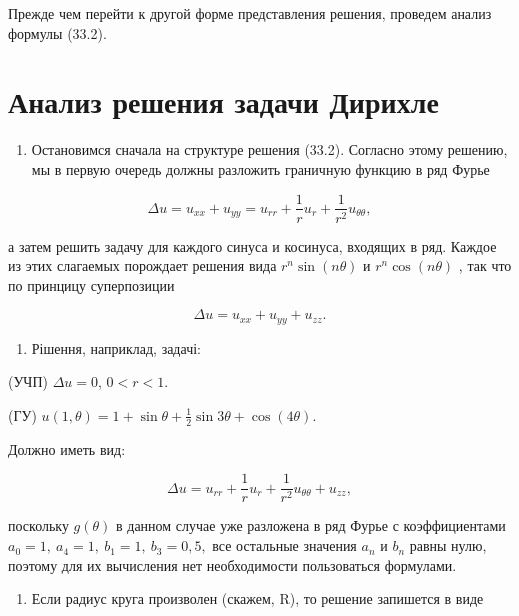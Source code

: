 \documentclass[
  ukrainian,
]{article}
\providecommand{\tightlist}{%
  \setlength{\itemsep}{0pt}\setlength{\parskip}{0pt}}
\begin{document}
Прежде чем перейти к другой форме представления решения, проведем анализ
формулы (33.2).

\section{Анализ решения задачи
Дирихле}\label{ux430ux43dux430ux43bux438ux437-ux440ux435ux448ux435ux43dux438ux44f-ux437ux430ux434ux430ux447ux438-ux434ux438ux440ux438ux445ux43bux435}

\begin{enumerate}
\def\labelenumi{\arabic{enumi}.}
\tightlist
\item
  Остановимся сначала на структуре решения (33.2). Согласно этому
  решению, мы в первую очередь должны разложить граничную функцию в ряд
  Фурье
\end{enumerate}

\[
\Delta u = u_{xx} + u_{yy} = u_{rr} + \frac{1}{r} u_r + \frac{1}{r^2} u_{\theta\theta},
\]

а затем решить задачу для каждого синуса и косинуса, входящих в ряд.
Каждое из этих слагаемых порождает решения вида \(r^n \sin{(n\theta)}\)
и \(r^n \cos{(n\theta)}\) , так что по принцицу суперпозиции

\[
\Delta u = u_{xx} + u_{yy} + u_{zz}.
\]

\begin{enumerate}
\def\labelenumi{\arabic{enumi}.}
\setcounter{enumi}{1}
\tightlist
\item
  Рішення, наприклад, задачі:
\end{enumerate}

(УЧП) \(\Delta u = 0\), \(0 < r < 1\).

(ГУ)
\(u(1, \theta) = 1 + \sin \theta + \frac{1}{2} \sin 3\theta + \cos (4\theta)\).

Должно иметь вид:

\[
\Delta u = u_{rr} + \frac{1}{r} u_r + \frac{1}{r^2} u_{\theta\theta} + u_{zz},
\]

поскольку \(g(\theta)\) в данном случае уже разложена в ряд Фурье с
коэффициентами \(a_0=1,\ a_4=1,\ b_1=1,\ b_3=0,5,\) все остальные
значения \(a_n\) и \(b_n\) равны нулю, поэтому для их вычисления нет
необходимости пользоваться формулами.

\begin{enumerate}
\def\labelenumi{\arabic{enumi}.}
\setcounter{enumi}{2}
\tightlist
\item
  Если радиус круга произволен (скажем, R), то решение запишется в виде
\end{enumerate}
\end{document}

